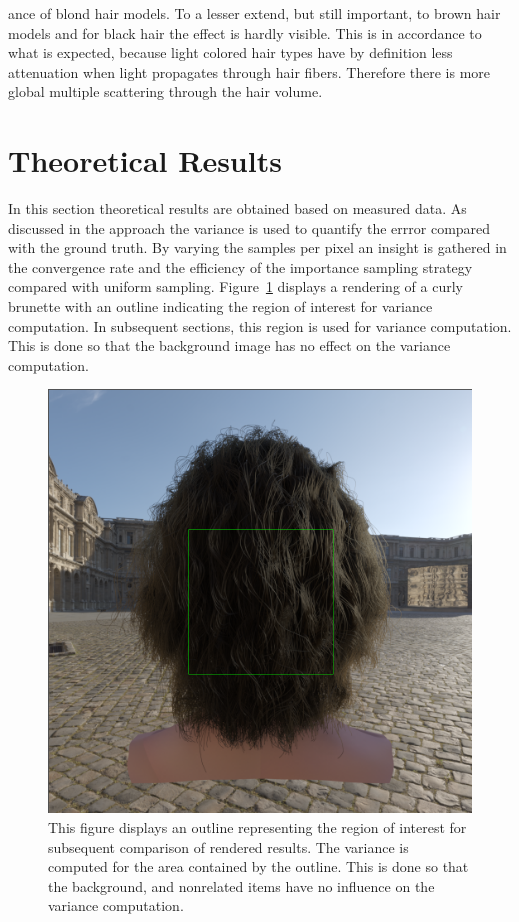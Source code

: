 \documentclass[11pt,a4paper]{report}
\begin{document}
ance of blond hair models. To a lesser extend, but still important, to brown hair models and for black hair the effect is hardly visible. This is in accordance to what is expected, because light colored hair types have by definition less attenuation when light propagates through hair fibers. Therefore there is more global multiple scattering through the hair volume.

\section{Theoretical Results}

In this section theoretical results are obtained based on measured data. As discussed in the approach the variance is used to quantify the errror compared with the ground truth. By varying the samples per pixel an insight is gathered in the convergence rate and the efficiency of the importance sampling strategy compared with uniform sampling. Figure~\ref{fig_variance_outline} displays a rendering of a curly brunette with an outline indicating the region of interest for variance computation. In subsequent sections, this region is used for variance computation. This is done so that the background image has no effect on the variance computation.

\begin{figure}
\begin{center}
\includegraphics[scale=0.2]{variance-results/outline_hint.png}
\end{center}
\caption{This figure displays an outline representing the region of interest for subsequent comparison of rendered results. The variance is computed for the area contained by the outline. This is done so that the background, and nonrelated items have no influence on the variance computation.}
\label{fig_variance_outline}
\end{figure}
\end{document}
